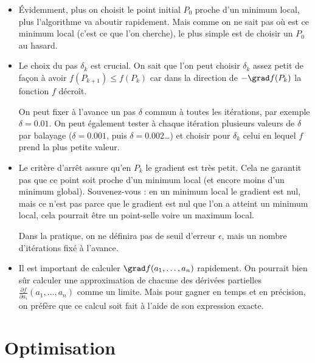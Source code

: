 \documentclass[11pt,class=report,crop=false]{standalone}
\begin{document}
\begin{remarque*}
\sauteligne
\begin{itemize}
  \item \'Evidemment, plus on choisit le point initial $P_0$ proche d'un minimum local, plus l'algorithme va aboutir rapidement. Mais comme on ne sait pas où est ce minimum local (c'est ce que l'on cherche), le plus simple est de choisir un $P_0$ au hasard.

  \item Le choix du pas $\delta_k$ est crucial. On sait que l'on peut choisir $\delta_k$ assez petit de façon à avoir $f(P_{k+1}) \le f(P_k)$ car dans la direction de $-\grad f(P_k)$ la fonction $f$ décroît.
  
  
  On peut fixer à l'avance un pas $\delta$ commun à toutes les itérations, par exemple $\delta = 0.01$. On peut également tester à chaque itération plusieurs valeurs de $\delta$ par balayage ($\delta = 0.001$, puis $\delta=0.002$\ldots) et choisir pour $\delta_k$ celui en lequel $f$ prend la plus petite valeur.
  
  \item Le critère d'arrêt assure qu'en $P_k$ le gradient est très petit. Cela ne garantit pas que ce point soit proche d'un minimum local (et encore moins d'un minimum global). Souvenez-vous : en un minimum local le gradient est nul, mais ce n'est pas parce que le gradient est nul que l'on a atteint un minimum local, cela pourrait être un point-selle voire un maximum local.
  
    Dans la pratique, on ne définira pas de seuil d'erreur $\epsilon$, mais un nombre d'itérations fixé à l'avance.
  
  \item Il est important de calculer $\grad f(a_1,\ldots,a_n)$ rapidement. On pourrait bien sûr calculer une approximation de chacune des dérivées partielles $\frac{\partial f}{\partial a_i}(a_1,\ldots,a_n)$ comme un limite. Mais pour gagner en temps et en précision, on préfère que ce calcul soit fait à l'aide de son expression exacte. 
  
\end{itemize}
\end{remarque*}



\section{Optimisation}
\end{document}
